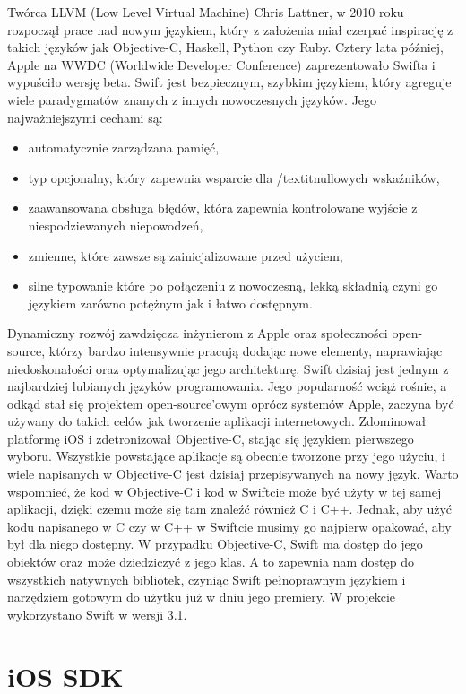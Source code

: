 Twórca LLVM (Low Level Virtual Machine) Chris Lattner\cite{LLVM}, w 2010 roku rozpoczął prace nad nowym językiem, który z założenia miał czerpać inspirację z takich języków jak Objective-C, Haskell, Python czy Ruby. Cztery lata później, Apple na WWDC (Worldwide Developer Conference) zaprezentowało Swifta i wypuściło wersję beta\cite{2014-wwdc-swift}. Swift jest bezpiecznym, szybkim językiem, który agreguje wiele paradygmatów znanych z innych nowoczesnych języków. Jego najważniejszymi cechami są:
\begin{itemize}
    \item automatycznie zarządzana pamięć,
    \item typ opcjonalny, który zapewnia wsparcie dla /textit{nullowych} wskaźników,
    \item zaawansowana obsługa błędów, która zapewnia kontrolowane wyjście z niespodziewanych niepowodzeń,
    \item zmienne, które zawsze są zainicjalizowane przed użyciem,
    \item silne typowanie które po połączeniu z nowoczesną, lekką składnią czyni go językiem zarówno potężnym jak i łatwo dostępnym.
\end{itemize}
Dynamiczny rozwój zawdzięcza inżynierom z Apple oraz społeczności open-source, którzy bardzo intensywnie pracują dodając nowe elementy, naprawiając niedoskonałości oraz optymalizując jego architekturę. Swift dzisiaj jest jednym z najbardziej lubianych języków programowania. Jego popularność wciąż rośnie, a odkąd stał się projektem open-source'owym oprócz systemów Apple, zaczyna być używany do takich celów jak tworzenie aplikacji internetowych. Zdominował platformę iOS i zdetronizował Objective-C, stając się językiem pierwszego wyboru. Wszystkie powstające aplikacje są obecnie tworzone przy jego użyciu, i wiele napisanych w Objective-C jest dzisiaj przepisywanych na nowy język. Warto wspomnieć, że kod w Objective-C i kod w Swiftcie może być użyty w tej samej aplikacji, dzięki czemu może się tam znaleźć również C i C++. Jednak, aby użyć kodu napisanego w C czy w C++ w Swiftcie musimy go najpierw opakować, aby był dla niego dostępny. W przypadku Objective-C, Swift ma dostęp do jego obiektów oraz może dziedziczyć z jego klas. A to zapewnia nam dostęp do wszystkich natywnych bibliotek, czyniąc Swift pełnoprawnym językiem i narzędziem gotowym do użytku już w dniu jego premiery. W projekcie wykorzystano Swift w wersji 3.1.

\section{iOS SDK}

